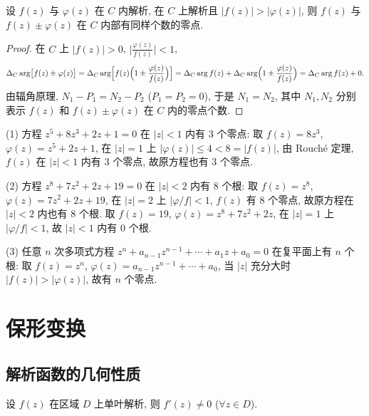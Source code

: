 \documentclass[theorem=false,mathfont=none,openany,sub3section]{easybook}
\begin{document}
\begin{theorem}[Rouch\'{e} 定理]
  设 $f(z)$ 与 $\varphi(z)$ 在 $C$ 内解析, 在 $C$ 上解析且 $|f(z)|>|\varphi(z)|$,
  则 $f(z)$ 与 $f(z)\pm\varphi(z)$ 在 $C$ 内部有同样个数的零点.
\end{theorem}

\begin{proof}
  在 $C$ 上 $|f(z)|>0$, $\bigl|\frac{\varphi(z)}{f(z)}\bigr|<1$,
  \[
  \Delta_{C}\arg\bigl[f(z)\pm\varphi(z)\bigr]
  =\Delta_{C}\arg\Bigl[f(z)\Bigl(1\pm\frac{\varphi(z)}{f(z)}\Bigr)\Bigr]
  =\Delta_{C}\arg f(z)+\Delta_{C}\arg\Bigl(1\pm\frac{\varphi(z)}{f(z)}\Bigr)
  =\Delta_{C}\arg f(z)+0.
  \]
  由辐角原理, $N_{1}-P_{1}=N_{2}-P_{2}$ ($P_{1}=P_{2}=0$),
  于是 $N_{1}=N_{2}$, 其中 $N_{1},N_{2}$ 分别表示 $f(z)$ 和 $f(z)\pm\varphi(z)$ 在 $C$ 内的零点个数.
\end{proof}

\begin{example}
  (1) 方程 $z^{5}+8z^{3}+2z+1=0$ 在 $|z|<1$ 内有 3 个零点:
  取 $f(z)=8z^{3}$, $\varphi(z)=z^{5}+2z+1$, 在 $|z|=1$ 上 $|\varphi(z)|\leq4<8=|f(z)|$, 由 Rouch\'e 定理, $f(z)$ 在 $|z|<1$ 内有 3 个零点, 故原方程也有 3 个零点.

  (2) 方程 $z^{8}+7z^{2}+2z+19=0$ 在 $|z|<2$ 内有 8 个根:
  取 $f(z)=z^{8}$, $\varphi(z)=7z^{2}+2z+19$, 在 $|z|=2$ 上 $|\varphi/f|<1$, $f(z)$ 有 8 个零点, 故原方程在 $|z|<2$ 内也有 8 个根.
  取 $f(z)=19$, $\varphi(z)=z^{8}+7z^{2}+2z$, 在 $|z|=1$ 上 $|\varphi/f|<1$, 故 $|z|<1$ 内有 0 个根.

  (3) 任意 $n$ 次多项式方程 $z^{n}+a_{n-1}z^{n-1}+\cdots+a_{1}z+a_{0}=0$ 在复平面上有 $n$ 个根:
  取 $f(z)=z^{n}$, $\varphi(z)=a_{n-1}z^{n-1}+\cdots+a_{0}$, 当 $|z|$ 充分大时 $|f(z)|>|\varphi(z)|$, 故有 $n$ 个零点.
\end{example}

\newpage

\chapter{保形变换}

\section{解析函数的几何性质}

\begin{theorem}
  设 $f(z)$ 在区域 $D$ 上单叶解析, 则 $f'(z)\neq0$ ($\forall z\in D$).
\end{theorem}
\end{document}
